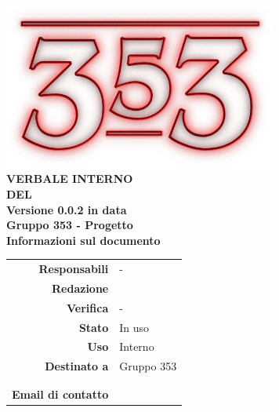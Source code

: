 \documentclass[openany, a4paper, 12pt]{report}
\begin{document}
\begin{titlepage}
	\centering
	\vfill
	{
		\bfseries
		\vskip2cm
		\includegraphics[width=9cm]{../../common/images/logo.png} \\
		\vfill
		\Huge{VERBALE INTERNO\\DEL {}}\\
		\vfill
		\Large Versione 0.0.2 in data \\
		\large Gruppo 353 - Progetto \progetto \\
		\vfill
		\normalsize Informazioni sul documento\\
		\begin{table}[htbp]
			\centering
			\renewcommand\arraystretch{1.2}
			\begin{tabular}{r|l}
				\hline
				\textbf{Responsabili}	& -\\
				
				\textbf{Redazione} 		& \Elena \\
				\textbf{Verifica} 		& - \\	
				
				\textbf{Stato} 			& In uso\\
				\textbf{Uso}			& Interno\\
				\textbf{Destinato a}   	& Gruppo 353\\
										& \Vardanega\\
										& \Cardin\\
				
				\textbf{Email di contatto}	& \mailleaf
			\end{tabular}
		\end{table}
		\vfill 
	}    
\end{titlepage}

\tableofcontents
\newpage
{}

 
\end{document}
